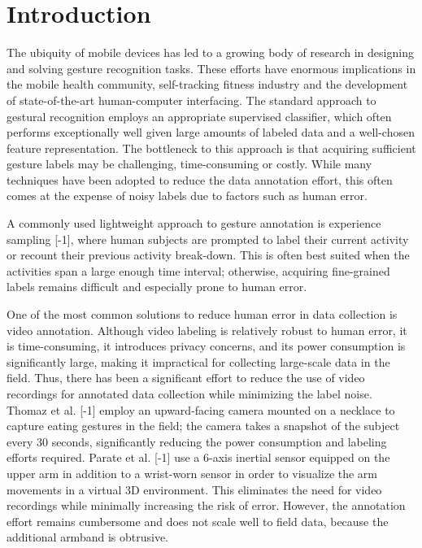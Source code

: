 \documentclass{sigchi}
\begin{document}
 


\section{Introduction}

The ubiquity of mobile devices has led to a growing body of research in designing and solving gesture recognition tasks. These efforts have enormous implications in the mobile health community, self-tracking fitness industry and the development of state-of-the-art human-computer interfacing. The standard approach to gestural recognition employs an appropriate supervised classifier, which often performs exceptionally well given large amounts of labeled data and a well-chosen feature representation. The bottleneck to this approach is that acquiring sufficient gesture labels may be challenging, time-consuming or costly. While many techniques have been adopted to reduce the data annotation effort, this often comes at the expense of noisy labels due to factors such as human error.

A commonly used lightweight approach to gesture annotation is experience sampling [-1], where human subjects are prompted to label their current activity or recount their previous activity break-down. This is often best suited when the activities span a large enough time interval; otherwise, acquiring fine-grained labels remains difficult and especially prone to human error.

One of the most common solutions to reduce human error in data collection is video annotation. Although video labeling is relatively robust to human error, it is time-consuming, it introduces privacy concerns, and its power consumption is significantly large, making it impractical for collecting large-scale data in the field. Thus, there has been a significant effort to reduce the use of video recordings for annotated data collection while minimizing the label noise. Thomaz et al. [-1] employ an upward-facing camera mounted on a necklace to capture eating gestures in the field; the camera takes a snapshot of the subject every 30 seconds, significantly reducing the power consumption and labeling efforts required. Parate et al. [-1] use a 6-axis inertial sensor equipped on the upper arm in addition to a wrist-worn sensor in order to visualize the arm movements in a virtual 3D environment. This eliminates the need for video recordings while minimally increasing the risk of error. However, the annotation effort remains cumbersome and does not scale well to field data, because the additional armband is obtrusive.
\end{document}
